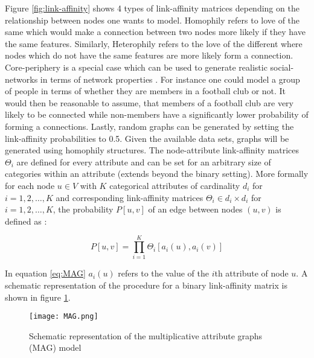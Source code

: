 	\noindent Figure \ref{fig:link-affinity} shows 4 types of link-affinity
	matrices depending on the relationship between nodes one wants to model.
	Homophily refers to love of the same which would make a connection between
	two nodes more likely if they have the same features. Similarly,
	Heterophily refers to the love of the different where nodes which do not
	have the same features are more likely form a connection. Core-periphery is
	a special case which can be used to generate realistic social-networks in
	terms of network properties \citep[p. 139]{kim2012multiplicative}. For
	instance one could model a group of people in terms of whether they are
	members in a football club or not. It would then be reasonable to assume,
	that members of a football club are very likely to be connected while
	non-members have a significantly lower probability of forming a
	connections. Lastly, random graphs can be generated by setting the
	link-affinity probabilities to 0.5. Given the available data sets, graphs 
	will be generated using homophily structures. The node-attribute
	link-affinity matrices $\Theta_i$ are defined for every attribute and can
	be set for an arbitrary size of categories within an attribute (extends
	beyond the binary setting). More formally for each node $u \in V$ with $K$
	categorical attributes of cardinality $d_i$ for $i = 1,2,\dots,K$ and
	corresponding link-affinity matrices $\Theta_i \in d_i \times d_i$ for
	$i=1,2,\dots,K$, the probability $P[u,v]$ of an edge between nodes
	$(u,v)$ is defined as \citep[p. 119]{kim2012multiplicative}:

	\begin{equation}
		P[u,v] = \prod_{i=1}^{K}\Theta_{i}[a_{i}(u),a_i(v)]
		\label{eq:MAG}
	\end{equation}

	\noindent In equation \ref{eq:MAG} $a_{i}(u)$ refers to the value of the 
	$i$th attribute of node $u$. A schematic representation of the procedure
	for a binary link-affinity matrix is shown in figure \ref{fig:MAG}.

	\begin{figure}[h]
		\centering
		\texttt{[image: MAG.png]}
		\caption{Schematic representation of the 
			multiplicative attribute graphs (MAG) model}
		\cite[p. 120]{kim2012multiplicative}
		\label{fig:MAG}
	\end{figure}
	

